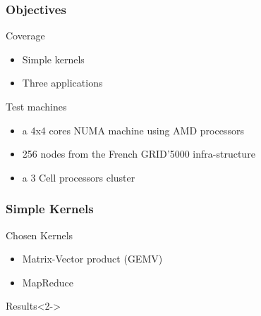 \frame
{
  \frametitle{Objectives}
  \begin{block}{Coverage}
 \begin{itemize}
  \footnotesize
  \item Simple kernels
  \item Three applications
  \end{itemize}
  \end{block}{}

  \begin{block}{Test machines}
  \begin{itemize}
  \footnotesize
  \item a 4x4 cores NUMA machine using AMD processors
  \item 256 nodes from the French GRID'5000 infra-structure
  \item a 3 Cell processors cluster
  \end{itemize}
  \end{block}{}
}

\frame
{
  \frametitle{Simple Kernels}
  \begin{block}{Chosen Kernels}
  \begin{itemize}
  \item Matrix-Vector product (GEMV)
  \item MapReduce
  \end{itemize}
  \end{block}{}

  \begin{block}{Results}<2->
  \end{block}{}
}

